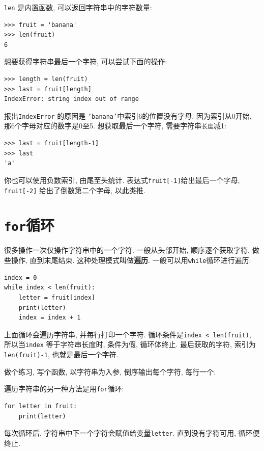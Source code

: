 \documentclass[10pt]{book}
\begin{document}
{\tt len} 是内置函数, 可以返回字符串中的字符数量:

\begin{verbatim}
>>> fruit = 'banana'
>>> len(fruit)
6
\end{verbatim}
%
想要获得字符串最后一个字符, 可以尝试下面的操作:

\begin{verbatim}
>>> length = len(fruit)
>>> last = fruit[length]
IndexError: string index out of range
\end{verbatim}
%
报出{\tt IndexError} 的原因是 {\tt 'banana'}中索引6的位置没有字母. 
因为索引从0开始, 那6个字母对应的数字是0至5.
想获取最后一个字符, 需要字符串{\tt 长度}减1:

\begin{verbatim}
>>> last = fruit[length-1]
>>> last
'a'
\end{verbatim}
%
你也可以使用负数索引, 由尾至头统计. 
表达式{\tt fruit[-1]}给出最后一个字母, 
{\tt fruit[-2]} 给出了倒数第二个字母, 以此类推. 


\section{{\tt for}循环}
\label{for}
很多操作一次仅操作字符串中的一个字符. 
一般从头部开始, 顺序逐个获取字符, 做些操作, 直到末尾结束. 
这种处理模式叫做{\bf 遍历}.
一般可以用{\tt while}循环进行遍历:

\begin{verbatim}
index = 0
while index < len(fruit):
    letter = fruit[index]
    print(letter)
    index = index + 1
\end{verbatim}
%
上面循环会遍历字符串, 并每行打印一个字符. 
循环条件是{\tt index < len(fruit)}, 
所以当{\tt index} 等于字符串长度时, 条件为假, 循环体终止. 
最后获取的字符, 索引为{\tt len(fruit)-1}, 也就是最后一个字符. 

做个练习, 写个函数, 以字符串为入参, 倒序输出每个字符, 每行一个. 

遍历字符串的另一种方法是用{\tt for}循环:

\begin{verbatim}
for letter in fruit:
    print(letter)
\end{verbatim}
%
每次循环后, 字符串中下一个字符会赋值给变量{\tt letter}. 
直到没有字符可用, 循环便终止. 
\end{document}
